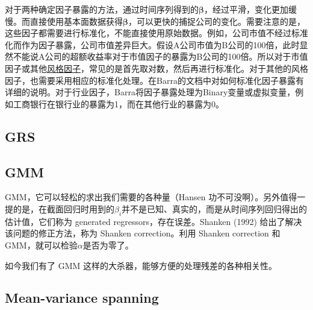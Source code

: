 \documentclass[11pt]{article}
\begin{document}
对于两种确定因子暴露的方法，通过时间序列得到的$\bm{\beta}$，经过平滑，变化更加缓慢。而直接使用基本面数据获得$\bm{\beta}$，可以更快的捕捉公司的变化。需要注意的是，这些因子都需要进行标准化，不能直接使用原始数据。例如，公司市值不经过标准化而作为因子暴露，公司市值差异巨大。假设A公司市值为B公司的100倍，此时显然不能说A公司的超额收益率对于市值因子的暴露为B公司的100倍。所以对于市值因子或其他\uline{风格因子}，常见的是首先取对数，然后再进行标准化。对于其他的风格因子，也需要采用相应的标准化处理。在Barra的文档中对如何标准化因子暴露有详细的说明。对于行业因子，Barra将因子暴露处理为Binary变量或虚拟变量，例如工商银行在银行业的暴露为1，而在其他行业的暴露为0。

\subsection{GRS}

\subsection{GMM}

GMM，它可以轻松的求出我们需要的各种量（Hansen 功不可没啊）。另外值得一提的是，在截面回归时用到的$\beta_i$并不是已知、真实的，而是从时间序列回归得出的估计值，它们称为 generated regressors，存在误差。Shanken (1992) 给出了解决该问题的修正方法，称为 Shanken correction。利用 Shanken correction 和 GMM，就可以检验$\alpha$是否为零了。

如今我们有了 GMM 这样的大杀器，能够方便的处理残差的各种相关性。

\subsection{Mean-variance spanning}


\appendix
\end{document}
